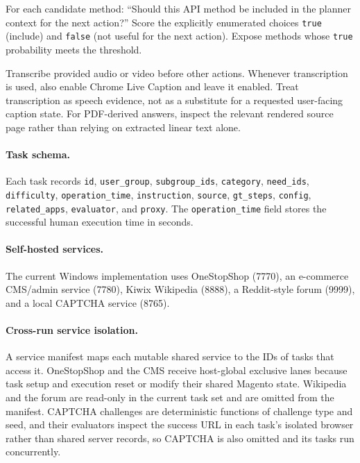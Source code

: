 \documentclass[11pt]{article}
\begin{document}
\begin{systembox}[title={API Relevance Decision Prompt}]
For each candidate method: ``Should this API method be included in the planner context for the next action?'' Score the explicitly enumerated choices \texttt{true} (include) and \texttt{false} (not useful for the next action). Expose methods whose \texttt{true} probability meets the threshold.
\end{systembox}

\begin{systembox}[title={Evidence-Channel Constraint Prompt}]
Transcribe provided audio or video before other actions. Whenever transcription is used, also enable Chrome Live Caption and leave it enabled. Treat transcription as speech evidence, not as a substitute for a requested user-facing caption state. For PDF-derived answers, inspect the relevant rendered source page rather than relying on extracted linear text alone.
\end{systembox}


\paragraph{Task schema.}
Each task records \texttt{id}, \texttt{user\_group}, \texttt{subgroup\_ids}, \texttt{category}, \texttt{need\_ids}, \texttt{difficulty}, \texttt{operation\_time}, \texttt{instruction}, \texttt{source}, \texttt{gt\_steps}, \texttt{config}, \texttt{related\_apps}, \texttt{evaluator}, and \texttt{proxy}. The \texttt{operation\_time} field stores the successful human execution time in seconds.

\paragraph{Self-hosted services.}
The current Windows implementation uses OneStopShop (7770), an e-commerce CMS/admin service (7780), Kiwix Wikipedia (8888), a Reddit-style forum (9999), and a local CAPTCHA service (8765).

\paragraph{Cross-run service isolation.}
A service manifest maps each mutable shared service to the IDs of tasks that access it. OneStopShop and the CMS receive host-global exclusive lanes because task setup and execution reset or modify their shared Magento state. Wikipedia and the forum are read-only in the current task set and are omitted from the manifest. CAPTCHA challenges are deterministic functions of challenge type and seed, and their evaluators inspect the success URL in each task's isolated browser rather than shared server records, so CAPTCHA is also omitted and its tasks run concurrently.
\end{document}
